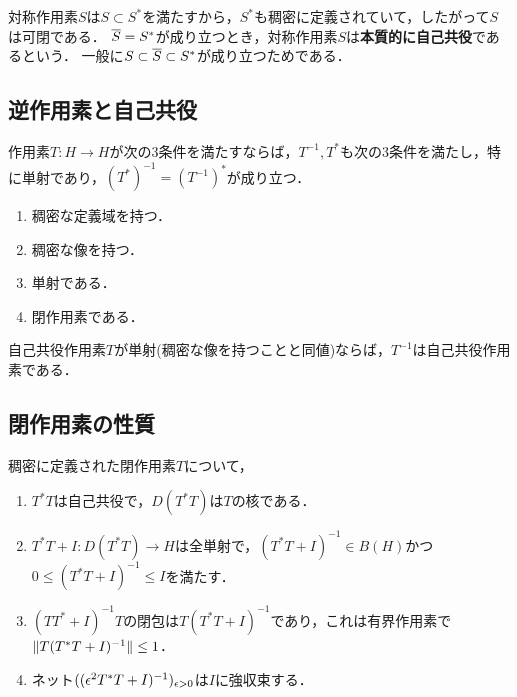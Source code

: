 \documentclass[uplatex,dvipdfmx]{jsreport}
\begin{document}
\begin{definition}
    対称作用素$S$は$S\subset S^*$を満たすから，$S^*$も稠密に定義されていて，したがって$S$は可閉である．
    $\overline{S}=S^*$が成り立つとき，対称作用素$S$は\textbf{本質的に自己共役}であるという．
    一般に$S\subset\overline{S}\subset S^*$が成り立つためである．
\end{definition}

\subsection{逆作用素と自己共役}

\begin{proposition}
    作用素$T:H\to H$が次の3条件を満たすならば，$T^{-1},T^*$も次の3条件を満たし，特に単射であり，$(T^*)^{-1}=(T^{-1})^*$が成り立つ．
    \begin{enumerate}
        \item 稠密な定義域を持つ．
        \item 稠密な像を持つ．
        \item 単射である．
        \item 閉作用素である．
    \end{enumerate}
\end{proposition}

\begin{corollary}
    自己共役作用素$T$が単射(稠密な像を持つことと同値)ならば，$T^{-1}$は自己共役作用素である．
\end{corollary}

\subsection{閉作用素の性質}

\begin{theorem}
    稠密に定義された閉作用素$T$について，
    \begin{enumerate}
        \item $T^*T$は自己共役で，$D(T^*T)$は$T$の核である．
        \item $T^*T+I:D(T^*T)\to H$は全単射で，$(T^*T+I)^{-1}\in B(H)$かつ$0\le(T^*T+I)^{-1}\le I$を満たす．
        \item $(TT^*+I)^{-1}T$の閉包は$T(T^*T+I)^{-1}$であり，これは有界作用素で$\|T(T^*T+I)^{-1}\|\le1$．
        \item ネット$((\epsilon^2T^*T+I)^{-1})_{\epsilon>0}$は$I$に強収束する．
    \end{enumerate}
\end{theorem}
\end{document}
